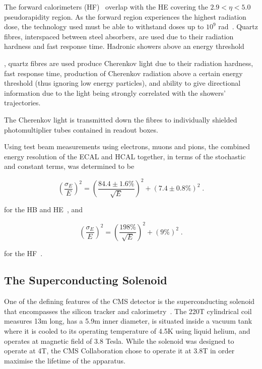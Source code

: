 The forward calorimeters (HF)~\cite{HF} overlap with the HE covering the $2.9 < \eta < 5.0$ pseudorapidity region.
As the forward region experiences the highest radiation dose, the technology used must be able to withstand  doses up to $10^{9}$ rad~\cite{HF}.
Quartz fibres, interspaced between steel absorbers, are used due to their radiation hardness and fast response time.
Hadronic showers above an energy threshold 

, quartz fibres are used produce Cherenkov light due to their radiation hardness, fast response time, production of Cherenkov radiation above a certain energy threshold (thus ignoring low energy particles), and ability to give directional information due to the light being strongly correlated with the showers' trajectories.

The Cherenkov light is transmitted down the fibres to individually shielded photomultiplier tubes contained in readout boxes.

Using test beam measurements using electrons, muons and pions, the combined energy resolution of the ECAL and HCAL together, in terms of the stochastic and constant terms, was determined to be

\begin{equation}
(\frac{\sigma_{E}}{E})^{2} = (\frac{84.4 \pm 1.6\%}{\sqrt{E}})^{2} + (7.4 \pm 0.8\%)^{2} \;.
\label{eq:hcalResolution}
\end{equation}

for the HB and HE~\cite{Abdullin:2008zzb}, and

\begin{equation}
(\frac{\sigma_{E}}{E})^{2} = (\frac{198\%}{\sqrt{E}})^{2} + (9\%)^{2} \;.
\label{eq:hfResolution}
\end{equation}

for the HF~\cite{Bayatian:2006jz}.

\subsection{The Superconducting Solenoid}\label{subsec:magnet}
One of the defining features of the CMS detector is the superconducting solenoid that encompasses the silicon tracker and calorimetry~\cite{Acquistapace:1997fm,Herve:2000}.
The 220T cylindrical coil measures 13m long, has a 5.9m inner diameter, is situated inside a vacuum tank where it is cooled to its operating temperature of 4.5K using liquid helium, and operates at magnetic field of 3.8 Tesla.
While the solenoid was designed to operate at 4T, the CMS Collaboration chose to operate it at 3.8T in order maximise the lifetime of the apparatus.

